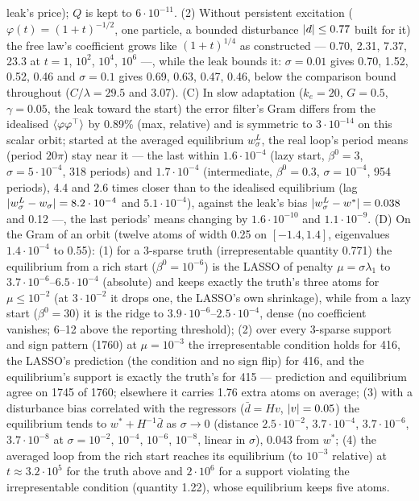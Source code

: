 \begin{sloppypar}
leak's price); $Q$ is kept to $6\cdot10^{-11}$. (2) Without persistent excitation ($\varphi(t) = (1 + t)^{-1/2}$, one
particle, a bounded disturbance $\lvert d\rvert\le0.77$ built for it) the free law's coefficient grows like $(1 + t)^{1/4}$ as
constructed --- 0.70, 2.31, 7.37, 23.3 at $t = 1$, $10^2$, $10^4$, $10^6$ ---, while the leak bounds it: $\sigma = 0.01$
gives 0.70, 1.52, 0.52, 0.46 and $\sigma = 0.1$ gives 0.69, 0.63, 0.47, 0.46, below the comparison bound throughout
($C/\lambda = 29.5$ and 3.07). (C) In slow adaptation ($k_e = 20$, $G = 0.5$, $\gamma = 0.05$, the leak toward the
start) the error filter's Gram differs from the idealised $\langle\varphi\varphi^\top\rangle$ by 0.89\% (max, relative)
and is symmetric to $3\cdot10^{-14}$ on this scalar orbit; started at the averaged equilibrium $w_\sigma^L$, the real
loop's period means (period $20\pi$) stay near it --- the last within $1.6\cdot10^{-4}$ (lazy start, $\beta^0 = 3$,
$\sigma = 5\cdot10^{-4}$, 318 periods) and $1.7\cdot10^{-4}$ (intermediate, $\beta^0 = 0.3$, $\sigma = 10^{-4}$, 954
periods), 4.4 and 2.6 times closer than to the idealised equilibrium (lag
$\lvert w_\sigma^L - w_\sigma\rvert = 8.2\cdot10^{-4}$ and $5.1\cdot10^{-4}$), against the leak's bias
$\lvert w_\sigma^L - w^*\rvert = 0.038$ and 0.12 ---, the last periods' means changing by $1.6\cdot10^{-10}$ and
$1.1\cdot10^{-9}$. (D) On the Gram of an orbit (twelve atoms of width 0.25 on $[-1.4,1.4]$, eigenvalues
$1.4\cdot10^{-4}$ to 0.55): (1) for a 3-sparse truth (irrepresentable quantity 0.771) the equilibrium from a rich start
($\beta^0 = 10^{-6}$) is the LASSO of penalty $\mu = \sigma\lambda_1$ to $3.7\cdot10^{-6}$--$6.5\cdot10^{-4}$
(absolute) and keeps exactly the truth's three atoms for $\mu\le10^{-2}$ (at $3\cdot10^{-2}$ it drops one, the LASSO's
own shrinkage), while from a lazy start ($\beta^0 = 30$) it is the ridge to $3.9\cdot10^{-6}$--$2.5\cdot10^{-4}$, dense
(no coefficient vanishes; 6--12 above the reporting threshold); (2) over every 3-sparse support and sign pattern (1760)
at $\mu = 10^{-3}$ the irrepresentable condition holds for 416, the LASSO's prediction (the condition and no sign flip)
for 416, and the equilibrium's support is exactly the truth's for 415 --- prediction and equilibrium agree on 1745 of
1760; elsewhere it carries 1.76 extra atoms on average; (3) with a disturbance bias correlated with the regressors
($\bar d = Hv$, $\lvert v\rvert = 0.05$) the equilibrium tends to $w^* + H^{-1}\bar d$ as $\sigma\to0$ (distance
$2.5\cdot10^{-2}$, $3.7\cdot10^{-4}$, $3.7\cdot10^{-6}$, $3.7\cdot10^{-8}$ at $\sigma = 10^{-2}$, $10^{-4}$, $10^{-6}$,
$10^{-8}$, linear in $\sigma$), 0.043 from $w^*$; (4) the averaged loop from the rich start reaches its equilibrium (to
$10^{-3}$ relative) at $t\approx3.2\cdot10^5$ for the truth above and $2\cdot10^6$ for a support violating the
irrepresentable condition (quantity 1.22), whose equilibrium keeps five atoms.
\end{sloppypar}

